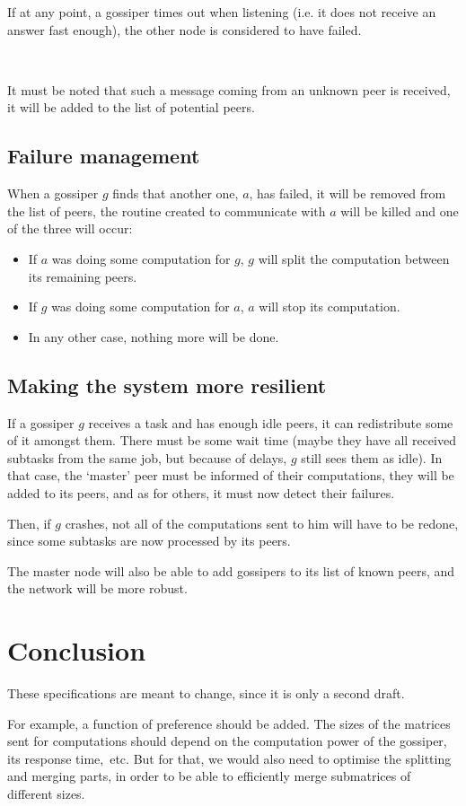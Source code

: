 \documentclass[a4paper,12pt]{article}
\begin{document}
    If at any point, a gossiper times out when listening (i.e. it does not receive an answer fast enough), the other node is considered to have failed.

~~

    It must be noted that such a message coming from an unknown peer is received, it will be added to the list of potential peers.

    \subsection{Failure management}
    When a gossiper $g$ finds that another one, $a$, has failed, it will be removed from the list of peers, the routine created to communicate with $a$ will be killed and one of the three will occur:

\begin{itemize}
\item If $a$ was doing some computation for $g$, $g$ will split the computation between its remaining peers.
\item If $g$ was doing some computation for $a$, $a$ will stop its computation.
\item In any other case, nothing more will be done.
\end{itemize}

    \subsection{Making the system more resilient}
    If a gossiper $g$ receives a task and has enough idle peers, it can redistribute some of it amongst them. There must be some wait time (maybe they have all received subtasks from the same job, but because of delays, $g$ still sees them as idle).
In that case, the ‘master’ peer must be informed of their computations, they will be added to its peers, and as for others, it must now detect their failures.

    Then, if $g$ crashes, not all of the computations sent to him will have to be redone, since some subtasks are now processed by its peers.

    The master node will also be able to add gossipers to its list of known peers, and the network will be more robust.

    \section{Conclusion}
    These specifications are meant to change, since it is only a second draft.

    For example, a function of preference should be added. The sizes of the matrices sent for computations should depend on the computation power of the gossiper, its response time,~etc. But for that, we would also need to optimise the splitting and merging parts, in order to be able to efficiently merge submatrices of different sizes.
\end{document}
